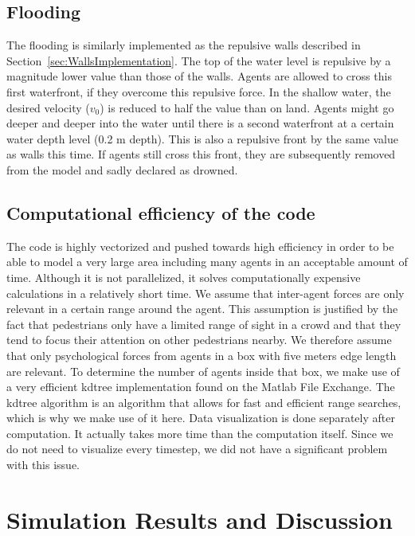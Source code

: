 \documentclass[11pt]{article}
\begin{document}
\subsection{Flooding}

The flooding is similarly implemented as the repulsive walls described in Section~\ref{sec:WallsImplementation}. The top of the water level is repulsive by a magnitude lower value than those of the walls. Agents are allowed to cross this first waterfront, if they overcome this repulsive force. In the shallow water, the desired velocity ($v_0$) is reduced to half the value than on land. Agents might go deeper and deeper into the water until there is a second waterfront at a certain water depth level (0.2 m depth). This is also a repulsive front by the same value as walls this time. If agents still cross this front, they are subsequently removed from the model and sadly declared as drowned.

\subsection{Computational efficiency of the code}
The code is highly vectorized and pushed towards high efficiency in order to be able to model a very large area including many agents in an acceptable amount of time. Although it is not parallelized, it solves computationally expensive calculations in a relatively short time. We assume that inter-agent forces are only relevant in a certain range around the agent. This assumption is justified by the fact that pedestrians only have a limited range of sight in a crowd and that they tend to focus their attention on other pedestrians nearby. We therefore assume that only psychological forces from agents in a box with five meters edge length are relevant. To determine the number of agents inside that box, we make use of a very efficient kdtree implementation found on the Matlab File Exchange. The kdtree algorithm is an algorithm that allows for fast and efficient range searches, which is why we make use of it here.
Data visualization is done separately after computation. It actually takes more time than the computation itself. Since we do not need to visualize every timestep, we did not have a significant problem with this issue.

\section{Simulation Results and Discussion}
\end{document}
